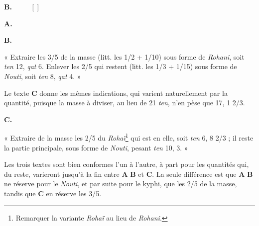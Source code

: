 \documentclass[a4paper, 11pt, oneside]{article}
\newcommand*\hieroAAAB{}
\newcommand*\hieroAAAM{}
\newcommand*\hieroAABT{}
\newcommand*\hieroAACQ{}
\newcommand*\hieroAACY{}
\newcommand*\hieroAADL{}
\newcommand*\hieroAADT{}
\newcommand*\hieroAAFD{}
\newcommand*\hieroAAFT{}
\newcommand*\hieroAAGA{}
\newcommand*\hieroAAGN{}
\newcommand*\hieroAAGP{}
\newcommand*\hieroAAHJ{}
\newcommand*\hieroAAHK{}
\newcommand*\hieroAAHW{}
\newcommand*\hieroAAIG{}
\newcommand*\hieroAAIJ{}
\newcommand*\hieroAAIO{}
\newcommand*\hieroAAIP{}
\newcommand*\hieroAAIT{}
\newcommand*\hieroAAIU{}
\newcommand*\hieroAAIW{}
\newcommand*\hieroAAIX{}
\newcommand*\hieroAAIY{}
\newcommand*\hieroAAIZ{}
\newcommand*\hieroAAJA{}
\newcommand*\hieroAAJB{}
\newcommand*\hieroAAJC{}
\newcommand*\hieroAAJD{}
\newcommand*\hieroAAJE{}
\newcommand*\hieroAAJF{}
\newcommand*\hieroAAJG{}
\newcommand*\hieroAAJH{}
\newcommand*\hieroAAJI{}
\newcommand*\hieroAAJJ{}
\newcommand*\hieroAAJK{}
\newcommand*\hieroAAJL{}
\newcommand*\hieroAAJM{\raisebox{1ex}{}}
\newcommand*\hieroAAJN{}
\newcommand*\hieroAAJO{}
\newcommand*\hieroAAJP{}
\newcommand*\hieroAAJQ{}
\newcommand*\hieroAAJR{}
\newcommand*\hieroAAJS{}
\newcommand*\hieroAAJT{}
\newcommand*\hieroAAJU{}
\newcommand*\hieroAAJV{}
\newcommand*\hieroAAJW{}
\newcommand*\hieroAAJX{}
\begin{document}
\hspace*{10mm}\textbf{B.}\hspace*{5mm} $\hieroAACQ\:\hieroAAIW\:\hieroAAIX\:\hieroAADT\:\hieroAADL\:\hieroAAIP\:\hieroAAIY\:\hieroAAIZ\:\hieroAAAM\:\hieroAAAM\:\hieroAADL$ [$\hieroAABT\:\hieroAAGN\:\hieroAAFT$] $\hieroAAIU\:\hieroAAJA\:\hieroAAJB\:\hieroAAJC$

\hspace*{10mm}\textbf{A.}\hspace*{5mm} $\hieroAAIJ\:\hieroAAJD\:\hieroAAHK\:\hieroAAJE\:\hieroAAGP\:\hieroAAJF\:\hieroAAIT\:\hieroAAJG\:\hieroAAGA\:\hieroAAJH$

\hspace*{10mm}\textbf{B.}\hspace*{5mm} $\hieroAAJI\:\hieroAAJJ\:\hieroAAJK\:\hieroAAGP\:\hieroAAAM\:\hieroAAAM\:\hieroAADL\:\hieroAABT\:\hieroAAGN\:\hieroAAFT\:\hieroAAJL\:\hieroAAGA\:\hieroAAJB\:\hieroAAJH$

« Extraire les 3/5 de la masse (litt. les 1/2 + 1/10) sous forme de \emph{Rohani}, soit \emph{ten} 12, \emph{qat} 6. Enlever les 2/5 qui restent (litt. les 1/3 + 1/15) sous forme de \emph{Nouti}, soit \emph{ten} 8, \emph{qat} 4. »

Le texte \textbf{C} donne les mêmes indications, qui varient naturellement par la quantité, puisque la masse à diviser, au lieu de 21 \emph{ten}, n'en pèse que 17, 1 2/3.

\hspace*{10mm}\textbf{C.}\hspace*{5mm} $\hieroAAJM\:\hieroAAIO\:\hieroAAJN\:\hieroAAJO\:\hieroAAJP\:\hieroAAJQ\:\hieroAAAB\:\hieroAAAM\:\hieroAAAM\:\hieroAAHW\:\hieroAAJR\:\hieroAAJS\:\hieroAAJT\:\hieroAAGA\:\hieroAAJU\:\hieroAAJV\:\hieroAAIG\:\hieroAAJW\:\hieroAAGP\:\hieroAACY\:\hieroAAAM\:\hieroAAAM\:\hieroAAHW\:\hieroAAFD\:\hieroAAJX\:\hieroAAGA\:\hieroAAHJ$

« Extraire de la masse les 2/5 du \emph{Rohaï}\footnote{Remarquer la variante \emph{Rohaï} au lieu de \emph{Rohani}.} qui est en elle, soit \emph{ten} 6, 8 2/3 ; il reste la partie principale, sous forme de \emph{Nouti}, pesant \emph{ten} 10, 3. »

Les trois textes sont bien conformes l'un à l'autre, à part pour les quantités qui, du reste, varieront jusqu'à la fin entre \textbf{A} \textbf{B} et \textbf{C}. La seule différence est que \textbf{A} \textbf{B} ne réserve pour le \emph{Nouti}, et par suite pour le kyphi, que les 2/5 de la masse, tandis que \textbf{C} en réserve les 3/5.
\end{document}

